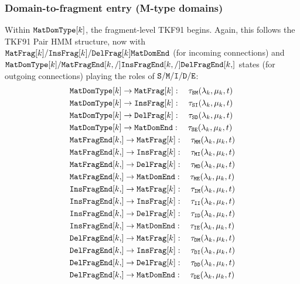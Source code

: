 \subsubsection{Domain-to-fragment entry (M-type domains)}

Within $\mathtt{MatDomType}[k]$, the fragment-level TKF91 begins.
Again, this follows the TKF91 Pair HMM structure, now with $\mathtt{MatFrag}[k]/\mathtt{InsFrag}[k]/\mathtt{DelFrag}[k]\mathtt{MatDomEnd}$ (for incoming connections) and $\matdomtype{k}/\mkfragend{k}/\mkifragend{k}/\mkdfragend{k}$ states (for outgoing connections)
playing the roles of ${\tt S}/{\tt M}/{\tt I}/{\tt D}/{\tt E}$:
\begin{align}
\matdomtype{k} &\to \mkfrag{k}: \quad \tkftrans_{\sta\mat}(\insrate_k,\delrate_k,\evoltime) \\
\matdomtype{k} &\to \mkifrag{k}: \quad \tkftrans_{\sta\ins}(\insrate_k,\delrate_k,\evoltime) \\
\matdomtype{k} &\to \mkdfrag{k}: \quad \tkftrans_{\sta\del}(\insrate_k,\delrate_k,\evoltime) \\
\matdomtype{k} &\to \matdomend: \quad \tkftrans_{\sta\fin}(\insrate_k,\delrate_k,\evoltime) \\
\mkfragend{k} &\to \mkfrag{k}: \quad \tkftrans_{\mat\mat}(\insrate_k,\delrate_k,\evoltime) \\
\mkfragend{k} &\to \mkifrag{k}: \quad \tkftrans_{\mat\ins}(\insrate_k,\delrate_k,\evoltime) \\
\mkfragend{k} &\to \mkdfrag{k}: \quad \tkftrans_{\mat\del}(\insrate_k,\delrate_k,\evoltime) \\
\mkfragend{k} &\to \matdomend: \quad \tkftrans_{\mat\fin}(\insrate_k,\delrate_k,\evoltime) \\
\mkifragend{k} &\to \mkfrag{k}: \quad \tkftrans_{\ins\mat}(\insrate_k,\delrate_k,\evoltime) \\
\mkifragend{k} &\to \mkifrag{k}: \quad \tkftrans_{\ins\ins}(\insrate_k,\delrate_k,\evoltime) \\
\mkifragend{k} &\to \mkdfrag{k}: \quad \tkftrans_{\ins\del}(\insrate_k,\delrate_k,\evoltime) \\
\mkifragend{k} &\to \matdomend: \quad \tkftrans_{\ins\fin}(\insrate_k,\delrate_k,\evoltime) \\
\mkdfragend{k} &\to \mkfrag{k}: \quad \tkftrans_{\del\mat}(\insrate_k,\delrate_k,\evoltime) \\
\mkdfragend{k} &\to \mkifrag{k}: \quad \tkftrans_{\del\ins}(\insrate_k,\delrate_k,\evoltime) \\
\mkdfragend{k} &\to \mkdfrag{k}: \quad \tkftrans_{\del\del}(\insrate_k,\delrate_k,\evoltime) \\
\mkdfragend{k} &\to \matdomend: \quad \tkftrans_{\del\fin}(\insrate_k,\delrate_k,\evoltime)
\end{align}

